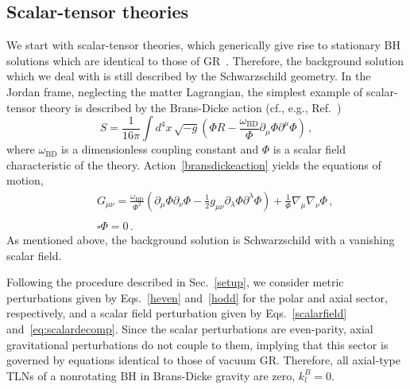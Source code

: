 \documentclass[aps,twocolumn,showpacs,preprintnumbers,nofootinbib,prd,superscriptaddress,groupedaddress,10pt]{revtex4-1}
\def\nn{\nonumber}
\newcommand{\beq}{\begin{eqnarray}}
\newcommand{\eeq}{\end{eqnarray}}
\begin{document}
\subsection{Scalar-tensor theories}\label{sec:ST}
We start with scalar-tensor theories, which generically give rise to stationary BH solutions which
are identical to those of GR~\cite{hawking1972,Sotiriou:2011dz,Berti:2015itd}. Therefore, the background solution which we deal with is still
described by the Schwarzschild geometry. 
In the Jordan frame, neglecting the matter Lagrangian, the simplest example of scalar-tensor theory is described by the Brans-Dicke action (cf., e.g., Ref.~\cite{Berti:2015itd})
%
\begin{equation}
\label{bransdickeaction}
S=\frac{1}{16\pi}\int d^4 x\,\sqrt{-g} \left(\Phi R-\frac{\omega_\text{BD}}{\Phi}\partial_\mu\Phi\partial^\mu\Phi\right)\,,
\end{equation}
%
where $\omega_\text{BD}$ is a dimensionless coupling constant and $\Phi$ is a scalar field characteristic of the theory. Action~\eqref{bransdickeaction} yields the equations of motion,
%
\beq
&&G_{\mu\nu}=\frac{\omega_\text{BD}}{\Phi^2}\left(\partial_\mu\Phi\partial_\nu\Phi-\frac12 g_{\mu\nu}\partial_{\lambda}\Phi\partial^\lambda\Phi\right)+\frac{1}{\Phi}\nabla_\mu\nabla_{\nu}\Phi\,,\nn\\\label{BDeqmov1}\\
&&\square\Phi=0\,. \label{BDeqmov2}
\eeq
%
As mentioned above, the background solution is Schwarzschild with a vanishing scalar field.


Following the procedure described in Sec.~\ref{setup}, we consider
metric perturbations given by Eqs.~\eqref{heven} and~\eqref{hodd} for the polar and axial sector, respectively, and a scalar field perturbation given by Eqs.~\eqref{scalarfield} and~\eqref{eq:scalardecomp}. Since the scalar perturbations are even-parity, axial gravitational perturbations do not couple to them, implying that this sector is governed by equations identical to those of vacuum GR. Therefore, all axial-type TLNs of a nonrotating BH in Brans-Dicke gravity are zero, $k^B_{l}=0$.
%
\end{document}
